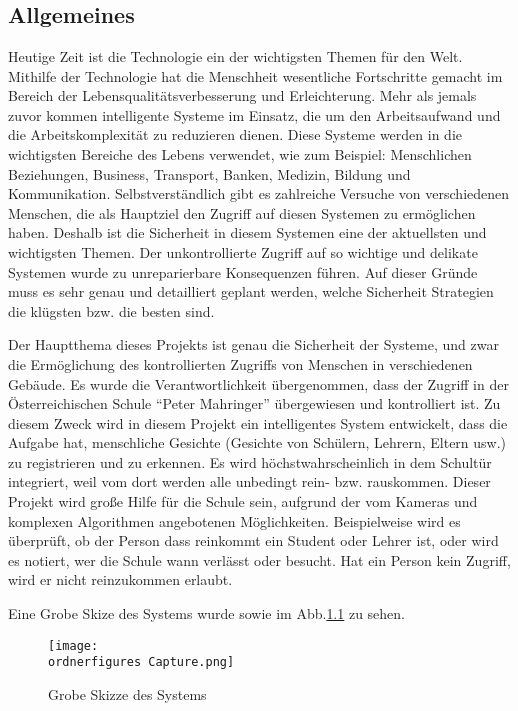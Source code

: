 \chapter{\docname}
\label{\docname}

\section{Allgemeines}
Heutige Zeit ist die Technologie ein der wichtigsten Themen für den Welt. Mithilfe der Technologie hat die Menschheit wesentliche Fortschritte gemacht im Bereich der Lebensqualitätsverbesserung und Erleichterung. Mehr als jemals zuvor kommen intelligente Systeme im Einsatz, die um den Arbeitsaufwand und die Arbeitskomplexität zu reduzieren dienen. Diese Systeme werden in die wichtigsten Bereiche des Lebens verwendet, wie zum Beispiel: Menschlichen Beziehungen, Business, Transport, Banken, Medizin, Bildung und Kommunikation. Selbstverständlich gibt es zahlreiche Versuche von verschiedenen Menschen, die als Hauptziel den Zugriff auf diesen Systemen zu ermöglichen haben. Deshalb ist die Sicherheit in diesem Systemen eine der aktuellsten und wichtigsten Themen. Der unkontrollierte Zugriff auf so wichtige und delikate Systemen wurde zu unreparierbare Konsequenzen führen. Auf dieser Gründe muss es sehr genau und detailliert geplant werden, welche Sicherheit Strategien die klügsten bzw. die besten sind.  

Der Hauptthema dieses Projekts ist genau die Sicherheit der Systeme, und zwar die Ermöglichung des kontrollierten Zugriffs von Menschen in verschiedenen Gebäude. Es wurde die Verantwortlichkeit übergenommen, dass der Zugriff in der Österreichischen Schule “Peter Mahringer” übergewiesen und kontrolliert ist. Zu diesem Zweck wird in diesem Projekt ein intelligentes System entwickelt, dass die Aufgabe hat, menschliche Gesichte (Gesichte von Schülern, Lehrern, Eltern usw.) zu registrieren und zu erkennen. Es wird höchstwahrscheinlich in dem Schultür integriert, weil vom dort werden alle unbedingt rein- bzw. rauskommen. Dieser Projekt wird große Hilfe für die Schule sein, aufgrund der vom Kameras und komplexen Algorithmen angebotenen Möglichkeiten. Beispielweise wird es überprüft, ob der Person dass reinkommt ein Student oder Lehrer ist, oder wird es notiert, wer die Schule wann verlässt oder besucht. Hat ein Person kein Zugriff, wird er nicht reinzukommen erlaubt.

Eine Grobe Skize des Systems wurde sowie im Abb.\ref{fig:grobe_Skizze} zu sehen.
\begin{figure}[htp]
	\texttt{[image: \\ordnerfigures Capture.png]}
	\caption{Grobe Skizze des Systems}
	\label{fig:grobe_Skizze}
\end{figure}

